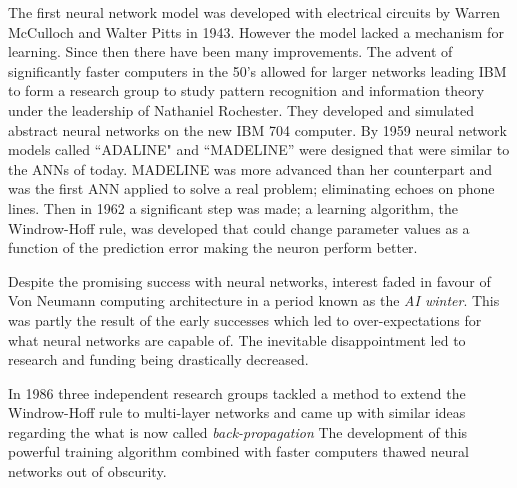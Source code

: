 The first neural network model was developed with electrical circuits by Warren McCulloch and Walter Pitts in 1943\citep{mcculloch1943logical}.
However the model lacked a mechanism for learning.
Since then there have been many improvements\citep{bengio2009advances}.
The advent of significantly faster computers in the 50's allowed for larger networks\citep{bengio2009advances} leading IBM to form a research group to study pattern recognition and information theory under the leadership of Nathaniel Rochester\citep{bengio2009advances}.
They developed and simulated abstract neural networks on the new IBM 704 computer.
By 1959 neural network models called ``ADALINE" and ``MADELINE'' were designed that were similar to the ANNs of today\citep{bengio2009advances}.
MADELINE was more advanced than her counterpart and was the first ANN applied to solve a real problem; eliminating echoes on phone lines.
Then in 1962 a significant step was made; a learning algorithm, the Windrow-Hoff rule, was developed that could change parameter values as a function of the prediction error\citep{bengio2009advances} making the neuron perform better.

Despite the promising success with neural networks, interest faded in favour of Von Neumann computing architecture in a period known as the \textit{AI winter}\citep{kurzweil2014singularity}. 
This was partly the result of the early successes which led to over-expectations for what neural networks are capable of.
The inevitable disappointment led to research and funding being drastically decreased.

In 1986 three independent research groups tackled a method to extend the Windrow-Hoff rule to multi-layer networks and came up with similar ideas regarding the what is now called \textit{back-propagation} 
The development of this powerful training algorithm combined with faster computers thawed neural networks out of obscurity.

